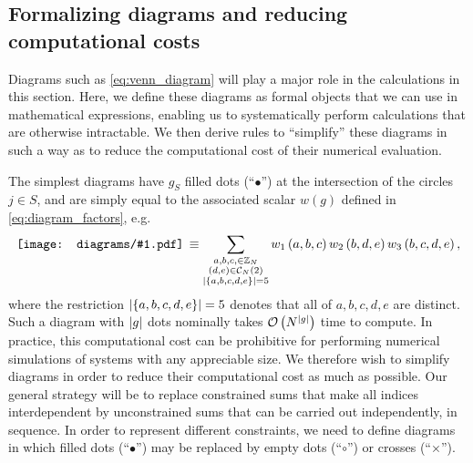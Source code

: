 \documentclass[nofootinbib,notitlepage,11pt]{revtex4-2}
\newcommand{\p}[1]{\left(#1\right)} %
\renewcommand{\set}[1]{\left\{#1\right\}} %
\newcommand{\1}{\mathds{1}}
\newcommand{\C}{\mathcal{C}}
\renewcommand{\O}{\mathcal{O}}
\newcommand{\ZZ}{\mathbb{Z}}
\newcommand{\diagram}[1]
{\,\texttt{[image: diagrams/\#1.pdf]}\,}
\begin{document}
\subsection{Formalizing diagrams and reducing computational costs}
\label{sec:diagrams}

Diagrams such as \eqref{eq:venn_diagram} will play a major role in the
calculations in this section.  Here, we define these diagrams as
formal objects that we can use in mathematical expressions, enabling
us to systematically perform calculations that are otherwise
intractable.  We then derive rules to ``simplify'' these diagrams in
such a way as to reduce the computational cost of their numerical
evaluation.

The simplest diagrams have $g_S$ filled dots (``$\bullet$'') at the
intersection of the circles $j\in S$, and are simply equal to the
associated scalar $w\p{g}$ defined in \eqref{eq:diagram_factors}, e.g.
\begin{align}
  \diagram{example_123}
  \equiv \sum_{\substack{a,b,c,\in\ZZ_N\\\p{d,e}\in\C_N\p{2}\\
      \abs{\set{a,b,c,d,e}}=5}}
  w_1\p{a,b,c} w_2\p{b,d,e} w_3\p{b,c,d,e},
\end{align}
where the restriction $\abs{\set{a,b,c,d,e}}=5$ denotes that all of
$a,b,c,d,e$ are distinct.  Such a diagram with $\abs{g}$ dots
nominally takes $\O\p{N^{\abs{g}}}$ time to compute.  In practice,
this computational cost can be prohibitive for performing numerical
simulations of systems with any appreciable size.  We therefore wish
to simplify diagrams in order to reduce their computational cost as
much as possible.  Our general strategy will be to replace constrained
sums that make all indices interdependent by unconstrained sums that
can be carried out independently, in sequence.  In order to represent
different constraints, we need to define diagrams in which filled dots
(``$\bullet$'') may be replaced by empty dots (``$\circ$'') or crosses
(``$\bm\times$'').
\end{document}

